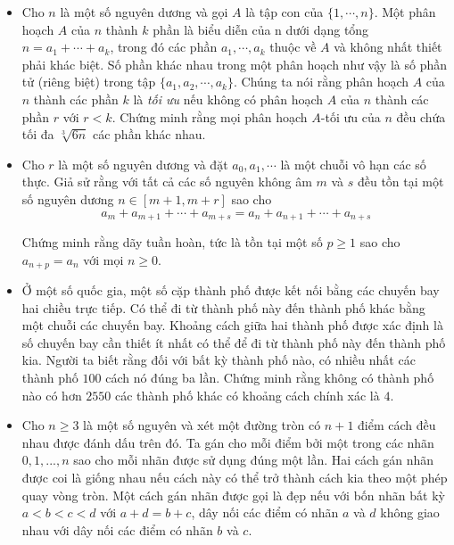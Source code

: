 \documentclass[11pt]{scrartcl}
\begin{document}
\begin{itemize}[label=, leftmargin=0em, itemsep=-0em]
    \item \begin{btvn}
        Cho $n$ là một số nguyên dương và gọi $A$ là tập con của $\{ 1,\cdots ,n\}$. Một phân hoạch $A$ của $n$ thành $k$ phần là biểu diễn của n dưới dạng tổng $n = a_1 + \cdots + a_k$, trong đó các phần $a_1 , \cdots , a_k $ thuộc về $A$ và không nhất thiết phải khác biệt. Số phần khác nhau trong một phân hoạch như vậy là số phần tử (riêng biệt) trong tập $\{ a_1 , a_2 , \cdots , a_k \} $.
        Chúng ta nói rằng phân hoạch $A$ của $n$ thành các phần $k$ là \textit{tối ưu} nếu không có phân hoạch $A$ của $n$ thành các phần $r$ với $r<k$. Chứng minh rằng mọi phân hoạch $A$-tối ưu của $n$ đều chứa tối đa $\sqrt[3]{6n}$ các phần khác nhau.
    \end{btvn}

    \item \begin{btvn}
        Cho $r$ là một số nguyên dương và đặt $a_0 , a_1 , \cdots $ là một chuỗi vô hạn các số thực. Giả sử rằng với tất cả các số nguyên không âm $m$ và $s$ đều tồn tại một số nguyên dương $n \in [m+1, m+r]$ sao cho
\[ a_m + a_{m+1} +\cdots +a_{m+s} = a_n + a_{n+1} +\cdots +a_{n+s} \]

        Chứng minh rằng dãy tuần hoàn, tức là tồn tại một số $p \ge 1 $ sao cho $a_{n+p} =a_n $ với mọi $n \ge 0$.
    \end{btvn}
    \item \begin{btvn} Ở một số quốc gia, một số cặp thành phố được kết nối bằng các chuyến bay hai chiều trực tiếp. Có thể đi từ thành phố này đến thành phố khác bằng một chuỗi các chuyến bay. Khoảng cách giữa hai thành phố được xác định là số chuyến bay cần thiết ít nhất có thể để đi từ thành phố này đến thành phố kia. Người ta biết rằng đối với bất kỳ thành phố nào, có nhiều nhất các thành phố $100$ cách nó đúng ba lần. Chứng minh rằng không có thành phố nào có hơn $2550$ các thành phố khác có khoảng cách chính xác là $4$.
    \end{btvn}
    
    \item \begin{btvn}
        Cho $n \ge 3$ là một số nguyên và xét một đường tròn có $n + 1$ điểm cách đều nhau được đánh dấu trên đó. Ta gán cho mỗi điểm bởi một trong các nhãn $0, 1, ... , n$ sao cho mỗi nhãn được sử dụng đúng một lần. Hai cách gán nhãn được coi là giống nhau nếu cách này có thể trở thành cách kia theo một phép quay vòng tròn. Một cách gán nhãn được gọi là đẹp nếu với bốn nhãn bất kỳ $a < b < c < d$ với $a + d = b + c$, dây nối các điểm có nhãn $a$ và $d$ không giao nhau với dây nối các điểm có nhãn $b$ và $c$.


\end{btvn}
\end{itemize}
\end{document}
